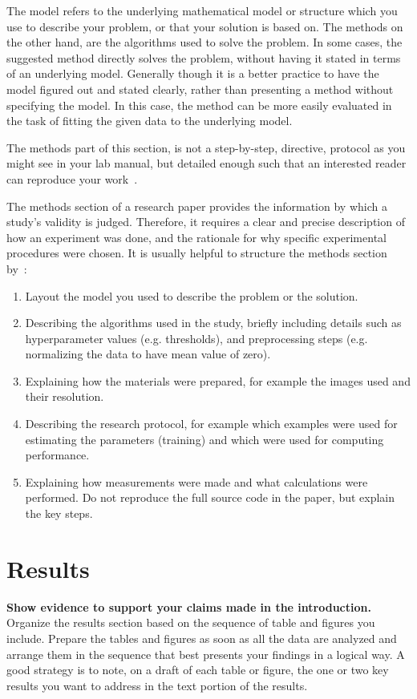 \documentclass[11pt,conference,compsocconf]{IEEEtran}
\begin{document}
The model refers to the underlying mathematical model or structure which 
you use to describe your problem, or that your solution is based on. 
The methods on the other hand, are the algorithms used to solve the problem. 
In some cases, the suggested method directly solves the problem, without having it 
stated in terms of an underlying model. Generally though it is a better practice to have 
the model figured out and stated clearly, rather than presenting a method without specifying 
the model. In this case, the method can be more easily evaluated in the task of fitting 
the given data to the underlying model.

The methods part of this section, is not a step-by-step, directive,
protocol as you might see in your lab manual, but detailed enough such
that an interested reader can reproduce your
work~\cite{anderson04,wavelab}.

The methods section of a research paper provides the information by
which a study's validity is judged.
Therefore, it requires a clear and precise description of how an
experiment was done, and the rationale
for why specific experimental procedures were chosen.
It is usually helpful to
structure the methods section by~\cite{kallet04methods}:
\begin{enumerate}
\item Layout the model you used to describe the problem or the solution.
\item Describing the algorithms used in the study, briefly including
  details such as hyperparameter values (e.g. thresholds), and
  preprocessing steps (e.g. normalizing the data to have mean value of
  zero).
\item Explaining how the materials were prepared, for example the
  images used and their resolution.
\item Describing the research protocol, for example which examples
  were used for estimating the parameters (training) and which were
  used for computing performance.
\item Explaining how measurements were made and what
  calculations were performed. Do not reproduce the full source code in
  the paper, but explain the key steps.
\end{enumerate}
 

\section{Results}\label{sec:results}
\textbf{Show evidence to support your claims made in the
  introduction.}
  Organize the results section based on the sequence of table and
figures you include. Prepare the tables and figures as soon as all
the data are analyzed and arrange them in the sequence that best
presents your findings in a logical way. A good strategy is to note,
on a draft of each table or figure, the one or two key results you
want to address in the text portion of the results.
\end{document}
